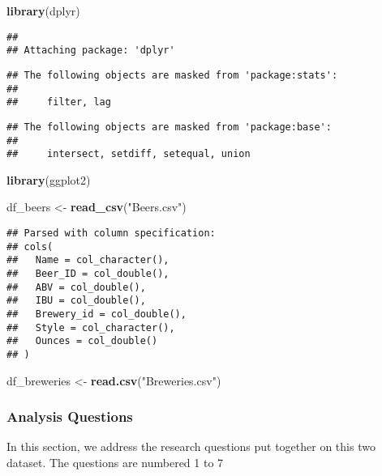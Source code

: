 \documentclass[]{article}
\newenvironment{Shaded}{\begin{snugshade}}{\end{snugshade}}
\newcommand{\KeywordTok}[1]{\textcolor[rgb]{0.13,0.29,0.53}{\textbf{#1}}}
\newcommand{\NormalTok}[1]{#1}
\newcommand{\StringTok}[1]{\textcolor[rgb]{0.31,0.60,0.02}{#1}}
\begin{document}
\begin{Shaded}
\begin{Highlighting}[]
\KeywordTok{library}\NormalTok{(dplyr)}
\end{Highlighting}
\end{Shaded}

\begin{verbatim}
## 
## Attaching package: 'dplyr'
\end{verbatim}

\begin{verbatim}
## The following objects are masked from 'package:stats':
## 
##     filter, lag
\end{verbatim}

\begin{verbatim}
## The following objects are masked from 'package:base':
## 
##     intersect, setdiff, setequal, union
\end{verbatim}

\begin{Shaded}
\begin{Highlighting}[]
\KeywordTok{library}\NormalTok{(ggplot2)}

\NormalTok{df_beers <-}\StringTok{ }\KeywordTok{read_csv}\NormalTok{(}\StringTok{"Beers.csv"}\NormalTok{)}
\end{Highlighting}
\end{Shaded}

\begin{verbatim}
## Parsed with column specification:
## cols(
##   Name = col_character(),
##   Beer_ID = col_double(),
##   ABV = col_double(),
##   IBU = col_double(),
##   Brewery_id = col_double(),
##   Style = col_character(),
##   Ounces = col_double()
## )
\end{verbatim}

\begin{Shaded}
\begin{Highlighting}[]
\NormalTok{df_breweries <-}\StringTok{ }\KeywordTok{read.csv}\NormalTok{(}\StringTok{"Breweries.csv"}\NormalTok{)}
\end{Highlighting}
\end{Shaded}

\hypertarget{analysis-questions}{%
\subsubsection{Analysis Questions}\label{analysis-questions}}

In this section, we address the research questions put together on this
two dataset. The questions are numbered 1 to 7
\end{document}
